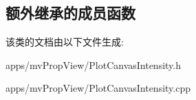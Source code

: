 \subsection*{额外继承的成员函数}


该类的文档由以下文件生成\+:\begin{DoxyCompactItemize}
\item 
apps/mv\+Prop\+View/Plot\+Canvas\+Intensity.\+h\item 
apps/mv\+Prop\+View/Plot\+Canvas\+Intensity.\+cpp\end{DoxyCompactItemize}
